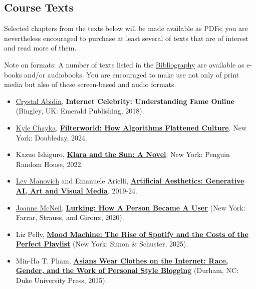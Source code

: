 \documentclass[
  letterpaper,
  DIV=11,
  numbers=noendperiod]{scrartcl}
\providecommand{\tightlist}{%
  \setlength{\itemsep}{0pt}\setlength{\parskip}{0pt}}
\begin{document}
\subsection{Course Texts}\label{course-texts}

Selected chapters from the texts below will be made available as PDFs;
you are nevertheless encouraged to purchase at least several of texts
that are of interest and read more of them.

Note on formats: A number of texts listed in the
\href{bibliography.qmd}{Bibliography} are available as e-books and/or
audiobooks. You are encouraged to make use not only of print media but
also of these screen-based and audio formats.

\begin{itemize}
\tightlist
\item
  \href{https://wishcrys.com/about-me/}{Crystal Abidin},
  \textbf{Internet Celebrity: Understanding Fame Online} (Bingley, UK:
  Emerald Publishing, 2018).\\
\item
  \href{https://www.kylechayka.com/}{Kyle Chayka},
  \href{https://www.kylechayka.com/filterworld}{\textbf{Filterworld: How
  Algorithms Flattened Culture}}. New York: Doubleday, 2024.\\
\item
  Kazuo Ishiguro,
  \href{https://www.penguinrandomhouse.com/books/653825/klara-and-the-sun-a-gma-book-club-pick-by-kazuo-ishiguro/}{\textbf{Klara
  and the Sun: A Novel}}. New York: Penguin Random House, 2022.\\
\item
  \href{https://manovich.net/}{Lev Manovich} and Emanuele Arielli,
  \href{http://manovich.net/index.php/projects/artificial-aesthetics-book}{\textbf{Artificial
  Aesthetics: Generative AI, Art and Visual Media}}. 2019-24.\\
\item
  \href{https://joannemcneil.com/}{Joanne McNeil}.
  \href{https://us.macmillan.com/books/9781250785756/lurking/}{\textbf{Lurking:
  How A Person Became A User}} (New York: Farrar, Strauss, and Giroux,
  2020).\\
\item
  Liz Pelly,
  \href{https://www.simonandschuster.com/books/Mood-Machine/Liz-Pelly/9781668083505}{\textbf{Mood
  Machine: The Rise of Spotify and the Costs of the Perfect Playlist}}
  (New York: Simon \& Schuster, 2025).\\
\item
  Min-Ha T. Pham,
  \href{https://www.dukeupress.edu/asians-wear-clothes-on-the-internet}{\textbf{Asians
  Wear Clothes on the Internet: Race, Gender, and the Work of Personal
  Style Blogging}} (Durham, NC: Duke University Press, 2015).
\end{itemize}
\end{document}

